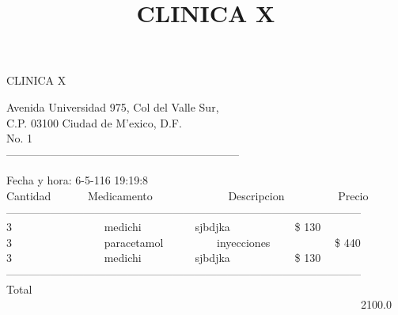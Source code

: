 \documentclass[10pt,a4paper]{letter}
\title{\bf CLINICA X}
\begin{document}
\begin{center}
{\scshape\LARGE CLINICA X\par}
{Avenida Universidad 975, Col del Valle Sur,\\}
{C.P. 03100 Ciudad de M'exico, D.F.}\\ 
{No. 1}\\ 
---------------------------------------------------------------
\end{center}

Fecha y hora: 6-5-116 19:19:8\\

Cantidad \ \ \ \ \ \ Medicamento \ \ \ \ \ \ \ \ \ \ \ \ \  Descripcion  \ \ \ \ \ \ \ \ \ Precio \\
------------------------------------------------------------------------------------------------ \\
3 \ \ \ \ \ \ \ \ \ \ \ \ \ \ \ \ medichi \ \ \ \ \ \ \ \ \ sjbdjka \ \ \ \ \ \ \ \ \ \ \ \$ 130 \\
3 \ \ \ \ \ \ \ \ \ \ \ \ \ \ \ \ paracetamol \ \ \ \ \ \ \ \ \ inyecciones \ \ \ \ \ \ \ \ \ \ \ \$ 440 \\
3 \ \ \ \ \ \ \ \ \ \ \ \ \ \ \ \ medichi \ \ \ \ \ \ \ \ \ sjbdjka \ \ \ \ \ \ \ \ \ \ \ \$ 130 \\

------------------------------------------------------------------------------------------------ \\
Total	\ \ \ \ \ \ \ \ \ \ \ \ \  \ \ \ \ \ \ \ \ \ \ \ \ \ \ \ \ \ \ \ \ \ \ \ \ \ \ \ \ \ \ \ \ \ \ \ \ \ \ \ \ \  \ \ \ \ \ \ \ \ \ \ 2100.0 \\
 
\end{document}
